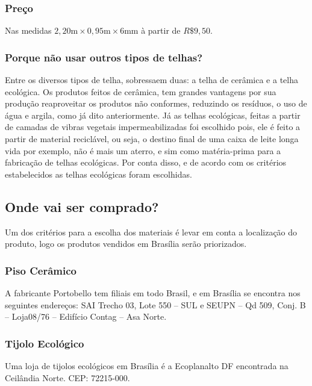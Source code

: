 \subsubsection*{\textbf{Preço}}

	Nas medidas $2,20\si{\meter} \times 0,95\si{\meter} \times 6\si{\meter\meter}$ à partir de $R\$ 9,50$.

\subsubsection*{\textbf{Porque não usar outros tipos de telhas?}}

	Entre os diversos tipos de telha, sobressaem duas: a telha de cerâmica e a telha ecológica. Os produtos feitos de cerâmica, tem grandes vantagens por sua produção reaproveitar os produtos não conformes, reduzindo os resíduos, o uso de água e argila, como já dito anteriormente. Já as telhas ecológicas, feitas a partir de camadas de vibras vegetais impermeabilizadas foi escolhido pois, ele é feito a partir de material reciclável, ou seja, o destino final de uma caixa de leite longa vida por exemplo, não é mais um aterro, e sim como matéria-prima para a fabricação de telhas ecológicas. Por conta disso, e de acordo com os critérios estabelecidos as telhas ecológicas foram escolhidas.

\subsection{Onde vai ser comprado?}

	Um dos critérios para a escolha dos materiais é levar em conta a localização do produto, logo os produtos vendidos em Brasília serão priorizados.


\subsubsection*{\textbf{Piso Cerâmico}}

	A fabricante Portobello tem filiais em todo Brasil, e em Brasília se encontra nos seguintes endereços: SAI Trecho 03, Lote 550 – SUL e SEUPN – Qd 509, Conj. B – Loja08/76 – Edifício Contag – Asa Norte.

\subsubsection*{\textbf{Tijolo Ecológico}}
	
	Uma loja de tijolos ecológicos em Brasília é a Ecoplanalto DF encontrada na Ceilândia Norte. CEP: 72215-000.

